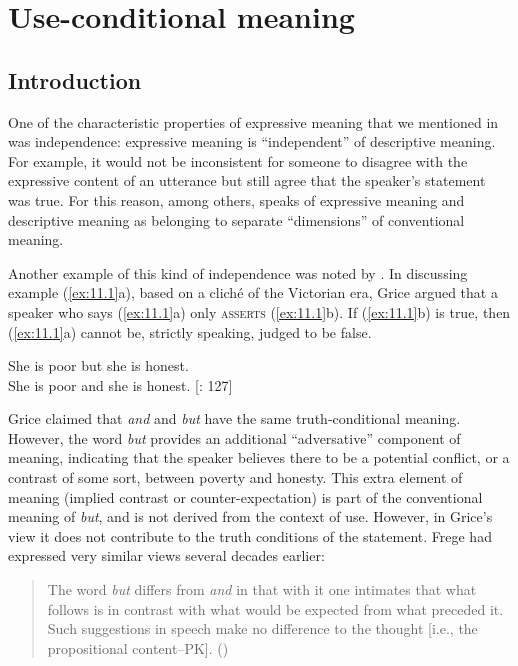 \chapter{Use-conditional meaning}\label{sec:11}

\section{Introduction}\label{sec:11.1}

One of the characteristic properties of expressive meaning that we mentioned in  was independence: expressive meaning is “independent” of descriptive meaning. For example, it would not be inconsistent for someone to disagree with the expressive content of an utterance but still agree that the speaker’s statement was true. For this reason, among others, \citet{Potts2007c} speaks of expressive meaning and descriptive meaning as belonging to separate “dimensions” of conventional meaning.


Another example of this kind of independence was noted by \citet{Grice1961}. In discussing example (\ref{ex:11.1}a), based on a cliché of the Victorian era, Grice argued that a speaker who says (\ref{ex:11.1}a) only \textsc{asserts} (\ref{ex:11.1}b). If (\ref{ex:11.1}b) is true, then (\ref{ex:11.1}a) cannot be, strictly speaking, judged to be false.



\ea \label{ex:11.1}
\ea She is poor but she is honest.\\
\ex She is poor and she is honest.  [\citealt{Grice1961}: 127]
                       \z
\z


Grice claimed that \textit{and} and \textit{but} have the same truth-conditional meaning. However, the word \textit{but} provides an additional “adversative” component of meaning, indicating that the speaker believes there to be a potential conflict, or a contrast of some sort, between poverty and honesty. This extra element of meaning (implied contrast or counter-expectation) is part of the conventional meaning of \textit{but}, and is not derived from the context of use. However, in Grice’s view it does not contribute to the truth conditions of the statement. Frege had expressed very similar views several decades earlier:


\begin{quote}
The word \textit{but} differs from \textit{and} in that with it one intimates that what follows is in contrast with what would be expected from what preceded it. Such suggestions in speech make no difference to the thought [i.e., the propositional content–PK].   (\citealt{Frege1918})
\end{quote}



